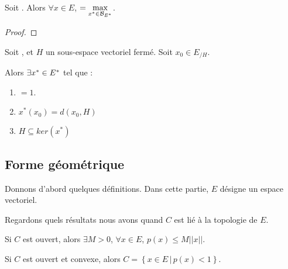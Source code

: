 \begin{corollary}
	Soit . Alors $\forall x \in E$,  
	$ = \max\limits_{x^{*} \in \mathcal{B}_{E^{*}}}$.
\end{corollary}

\begin{proof}
	
\end{proof}

\begin{corollary}
	Soit , et $H$ un sous-espace vectoriel fermé.
	Soit $x_{0} \in E_{/H}$.

	Alors $\exists x^{*} \in E^{*}$ tel que :

	\begin{enumerate}
		\item {} $ = 1$.
		\item $x^{*}(x_{0}) = d(x_{0}, H)$
		\item $H \subseteq ker(x^{*})$
	\end{enumerate}
\end{corollary}

\subsection{Forme géométrique}

Donnons d'abord quelques définitions. Dans cette partie, $E$ désigne un espace
vectoriel.



Regardons quels résultats nous avons quand $C$ est lié à la topologie de $E$.

\begin{proposition}
	Si $C$ est ouvert, alors $\exists M > 0$, $\forall x \in E$, $p(x) \leq M
	||x||$.
\end{proposition}

\begin{proposition}
	Si $C$ est ouvert et convexe, alors $C = \left\{x \in E \, | \, p(x) <
	1\right\}$.
\end{proposition}

